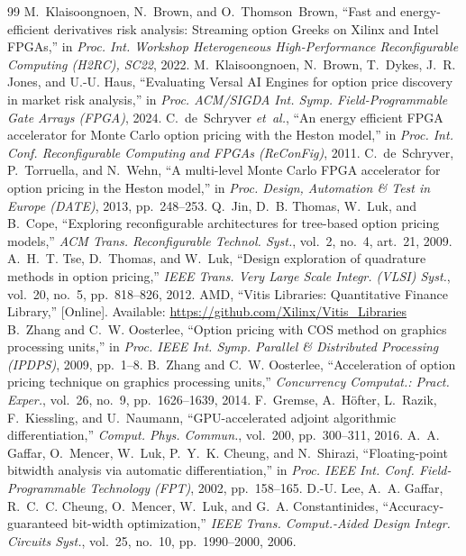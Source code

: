 \documentclass[conference]{IEEEtran}
\begin{document}
\begin{thebibliography}{99}
 M.~Klaisoongnoen, N.~Brown, and O.~Thomson~Brown, ``Fast and energy-efficient derivatives risk analysis: Streaming option Greeks on Xilinx and Intel FPGAs,'' in \emph{Proc. Int. Workshop Heterogeneous High-Performance Reconfigurable Computing (H2RC), SC22}, 2022.
 M.~Klaisoongnoen, N.~Brown, T.~Dykes, J.~R. Jones, and U.-U. Haus, ``Evaluating Versal AI Engines for option price discovery in market risk analysis,'' in \emph{Proc. ACM/SIGDA Int. Symp. Field-Programmable Gate Arrays (FPGA)}, 2024.
 C.~de~Schryver \emph{et~al.}, ``An energy efficient FPGA accelerator for Monte Carlo option pricing with the Heston model,'' in \emph{Proc. Int. Conf. Reconfigurable Computing and FPGAs (ReConFig)}, 2011.
 C.~de~Schryver, P.~Torruella, and N.~Wehn, ``A multi-level Monte Carlo FPGA accelerator for option pricing in the Heston model,'' in \emph{Proc. Design, Automation \& Test in Europe (DATE)}, 2013, pp.~248--253.
 Q.~Jin, D.~B. Thomas, W.~Luk, and B.~Cope, ``Exploring reconfigurable architectures for tree-based option pricing models,'' \emph{ACM Trans. Reconfigurable Technol. Syst.}, vol.~2, no.~4, art.~21, 2009.
 A.~H.~T. Tse, D.~Thomas, and W.~Luk, ``Design exploration of quadrature methods in option pricing,'' \emph{IEEE Trans. Very Large Scale Integr. (VLSI) Syst.}, vol.~20, no.~5, pp.~818--826, 2012.
 AMD, ``Vitis Libraries: Quantitative Finance Library,'' [Online]. Available: \url{https://github.com/Xilinx/Vitis_Libraries}
 B.~Zhang and C.~W. Oosterlee, ``Option pricing with COS method on graphics processing units,'' in \emph{Proc. IEEE Int. Symp. Parallel \& Distributed Processing (IPDPS)}, 2009, pp.~1--8.
 B.~Zhang and C.~W. Oosterlee, ``Acceleration of option pricing technique on graphics processing units,'' \emph{Concurrency Computat.: Pract. Exper.}, vol.~26, no.~9, pp.~1626--1639, 2014.
 F.~Gremse, A.~H\"ofter, L.~Razik, F.~Kiessling, and U.~Naumann, ``GPU-accelerated adjoint algorithmic differentiation,'' \emph{Comput. Phys. Commun.}, vol.~200, pp.~300--311, 2016.
 A.~A. Gaffar, O.~Mencer, W.~Luk, P.~Y.~K. Cheung, and N.~Shirazi, ``Floating-point bitwidth analysis via automatic differentiation,'' in \emph{Proc. IEEE Int. Conf. Field-Programmable Technology (FPT)}, 2002, pp.~158--165.
 D.-U. Lee, A.~A. Gaffar, R.~C.~C. Cheung, O.~Mencer, W.~Luk, and G.~A. Constantinides, ``Accuracy-guaranteed bit-width optimization,'' \emph{IEEE Trans. Comput.-Aided Design Integr. Circuits Syst.}, vol.~25, no.~10, pp.~1990--2000, 2006.

\end{thebibliography}
\end{document}
